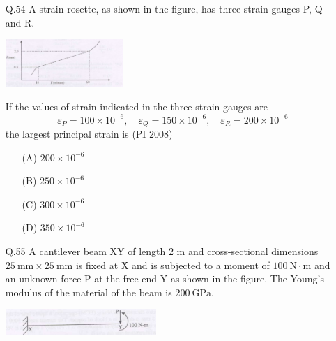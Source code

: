 \documentclass[journal,12pt,onecolumn]{IEEEtran}
\theoremstyle{remark}
\begin{document}
\begin{enumerate}
For a critical wear land of $1.8 \ \mathrm{mm}$, the cutting tool life (in minute) is  \hfill{(PI 2008)}
\begin{multicols}{4}
    \begin{enumerate}[label=(\Alph*)]
\item[(A)] 52.00
\item[(B)] 51.67
\item[(C)] 51.50
\item[(D)] 50.00
\end{enumerate}
\end{multicols}
\vspace{1cm}
\item[\textnormal{Q.54}] 
A strain rosette, as shown in the figure, has three strain gauges P, Q and R.  

\begin{center}
\includegraphics[width=0.35\textwidth]{figures/GATE-pi-2008-51.png}
\end{center}

If the values of strain indicated in the three strain gauges are  
\[
\varepsilon_P = 100 \times 10^{-6}, \quad
\varepsilon_Q = 150 \times 10^{-6}, \quad
\varepsilon_R = 200 \times 10^{-6}
\]
the largest principal strain is  \hfill{(PI 2008)}
\begin{multicols}{4}
    \begin{enumerate}[label=(\Alph*)]
\item[(A)] $200 \times 10^{-6}$
\item[(B)] $250 \times 10^{-6}$
\item[(C)] $300 \times 10^{-6}$
\item[(D)] $350 \times 10^{-6}$
\end{enumerate}
\end{multicols}
\vspace{1cm}
\item[\textnormal{Q.55}] 
A cantilever beam XY of length 2 m and cross-sectional dimensions $25\ \mathrm{mm} \times 25\ \mathrm{mm}$ is fixed at X and is subjected to a moment of $100\ \mathrm{N \cdot m}$ and an unknown force P at the free end Y as shown in the figure. The Young's modulus of the material of the beam is $200\ \mathrm{GPa}$.  

\begin{center}
\includegraphics[width=0.45\textwidth]{figures/GATE-pi-2008-55.png} %
\end{center}


\end{enumerate}
\end{document}
